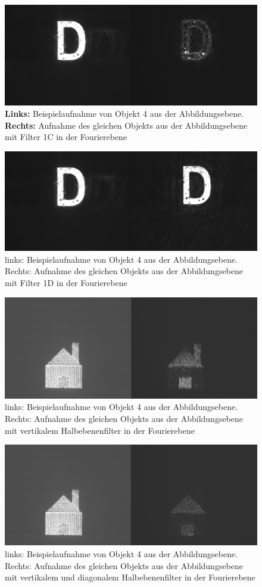 \begin{figure}
	\centering
	\includegraphics[width=0.7\linewidth]{images/example11_Filter1C.png}
	\caption{
		\textbf{Links:} Beispielaufnahme von Objekt 4 aus der Abbildungsebene.\\
		\textbf{Rechts:} Aufnahme des gleichen Objekts aus der Abbildungsebene mit Filter 1C in der Fourierebene
	}
	\label{fig:example11_Filter1C}
\end{figure}

\begin{figure}
	\centering
	\includegraphics[width=0.7\linewidth]{images/example12_Filter1D.png}
	\caption{links: Beispielaufnahme von Objekt 4 aus der Abbildungsebene. Rechts: Aufnahme des gleichen Objekts aus der Abbildungsebene mit Filter 1D in der Fourierebene}
	\label{fig:example12_Filter1D}
\end{figure}

\begin{figure}
	\centering
	\includegraphics[width=0.7\linewidth]{images/example17.png}
	\caption{links: Beispielaufnahme von Objekt 4 aus der Abbildungsebene. Rechts: Aufnahme des gleichen Objekts aus der Abbildungsebene mit vertikalem Halbebenenfilter in der Fourierebene}
	\label{fig:example17}
\end{figure}

\begin{figure}
	\centering
	\includegraphics[width=0.7\linewidth]{images/example18.png}
	\caption{links: Beispielaufnahme von Objekt 4 aus der Abbildungsebene. Rechts: Aufnahme des gleichen Objekts aus der Abbildungsebene mit vertikalem und diagonalem Halbebenenfilter in der Fourierebene}
	\label{fig:example18}
\end{figure}

